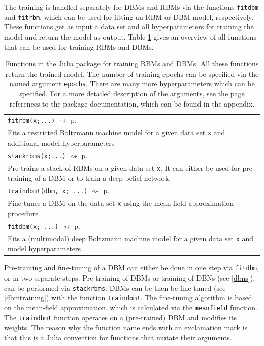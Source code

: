 \documentclass[12pt]{article}
\newcommand{\inlinecode}[1]{\texttt{#1}}
\newcommand{\rightpageref}[1]{\hfill $\rightsquigarrow$ p.\ \pageref{#1}}
\begin{document}
The training is handled separately for DBMs and RBMs via the functions \inlinecode{fitdbm} and \inlinecode{fitrbm}, which can be used for fitting an RBM or DBM model, respectively. 
These functions get as input a data set and all hyperparameters for training the model and return the model as output.
Table \ref{juliaFunTableTrain} gives an overview of all functions that can be used for training RBMs and DBMs.


\begin{table}[h]
\begin{tabularx}{\textwidth}{X}
   \hline
   \inlinecode{fitrbm(x;...)} \rightpageref{bms_fitrbm} \\
   Fits a restricted Boltzmann machine model for a given data set \inlinecode{x} and additional model hyperparameters \\
   \inlinecode{stackrbms(x;...)} \rightpageref{bms_stackrbms}\\
   Pre-trains a stack of RBMs on a given data set \inlinecode{x}. It can either be used for pre-training of a DBM or to train a deep belief network. \\
   \inlinecode{traindbm!(dbm, x; ...)} \rightpageref{bms_traindbm!} \\
   Fine-tunes a DBM on the data set \inlinecode{x} using the mean-field approximation procedure \\
     \inlinecode{fitdbm(x; ...)} \rightpageref{bms_fitdbm} \\
   Fits a (multimodal) deep Boltzmann machine model for a given data set \inlinecode{x} and model hyperparameters \\
   \hline
\end{tabularx}
\caption{Functions in the Julia package for training RBMs and DBMs. All these functions return the trained model. The number of training epochs can be specified via the named argument \inlinecode{epochs}. There are many more hyperparameters which can be specified. For a more detailed description of the arguments, see the page references to the package documentation, which can be found in the appendix.}\label{juliaFunTableTrain}
\end{table}

Pre-training and fine-tuning of a DBM can either be done in one step via \inlinecode{fitdbm}, or in two separate steps.
Pre-training of DBMs or training of DBNs (see \ref{dbns}), can be performed via \inlinecode{stackrbms}.
DBMs  can be then be fine-tuned (see \ref{dbmtraining}) with the function \inlinecode{traindbm!}.
The fine-tuning algorithm is based on the mean-field approximation, which is calculated via the \inlinecode{meanfield} function.
The \inlinecode{traindbm!} function operates on a (pre-trained) DBM and modifies its weights.
The reason why the function name ends with an exclamation mark is that this is a Julia convention for functions that mutate their arguments.
\end{document}
